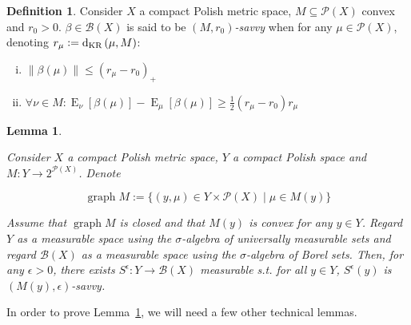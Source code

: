 \documentclass[aop,preprint]{imsart}
\numberwithin{equation}{section}
\theoremstyle{definition}
\newtheorem{definition}{Definition}[section]
\theoremstyle{plain}
\newtheorem{lemma}{Lemma}[section]
\newcommand{\N}[1]{\lVert #1 \rVert}
\DeclareMathOperator{\E}{E}
\DeclareMathOperator{\Gr}{graph}
\newcommand{\PM}{\mathcal{P}}
\newcommand{\DKR}{\operatorname{d}_{\textnormal{KR}}}
\newcommand{\Gm}{\mathcal{B}}
\begin{document}
\begin{samepage}
\begin{definition}

Consider $X$ a compact Polish metric space, $M \subseteq \PM\left(X\right)$ convex and $r_0 > 0$. $\beta \in \Gm\left(X\right)$ is said to be \emph{$\left(M,r_0\right)$-savvy} when for any $\mu \in \PM\left(X\right)$, denoting $r_\mu:=\DKR\left(\mu,M\right)$:

\begin{enumerate}[i.]

\item $\N{\beta\left(\mu\right)} \leq \left(r_\mu - r_0\right)_+$
\item $\forall \nu \in M: \E_\nu\left[\beta\left(\mu\right)\right] - \E_\mu\left[\beta\left(\mu\right)\right] \geq \frac{1}{2}\left(r_\mu - r_0\right) r_\mu$

\end{enumerate}

\end{definition}
\end{samepage}

\begin{samepage}
\begin{lemma}
\label{lmm:savvy}

Consider $X$ a compact Polish metric space, $Y$ a compact Polish space and $M: Y \rightarrow 2^{\PM\left(X\right)}$. Denote

\begin{equation*}
\Gr{M}:=\{\left(y, \mu\right) \in Y \times \PM\left(X\right) \mid \mu \in M\left(y\right)\}
\end{equation*}

Assume that $\Gr{M}$ is closed and that $M\left(y\right)$ is convex for any $y \in Y$. Regard $Y$ as a measurable space using the $\sigma$-algebra of universally measurable sets and regard $\Gm\left(X\right)$ as a measurable space using the $\sigma$-algebra of Borel sets. Then, for any $\epsilon > 0$, there exists $S^\epsilon: Y \rightarrow \Gm\left(X\right)$ measurable s.t. for all $y \in Y$, $S^\epsilon\left(y\right)$ is $\left(M\left(y\right),\epsilon\right)$-savvy.

\end{lemma}
\end{samepage}

In order to prove Lemma~\ref{lmm:savvy}, we will need a few other technical lemmas.
\end{document}

